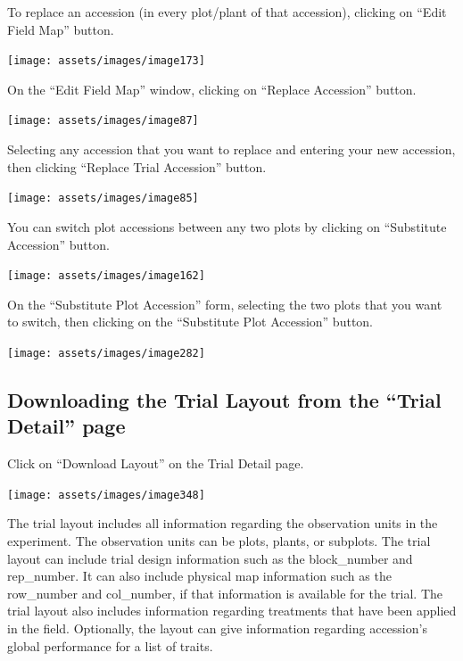 \documentclass[
  12pt,
]{book}
\begin{document}
To replace an accession (in every plot/plant of that accession), clicking on ``Edit Field Map'' button.

\begin{center}\texttt{[image: assets/images/image173]} \end{center}

On the ``Edit Field Map'' window, clicking on ``Replace Accession'' button.

\begin{center}\texttt{[image: assets/images/image87]} \end{center}

Selecting any accession that you want to replace and entering your new accession, then clicking ``Replace Trial Accession'' button.

\begin{center}\texttt{[image: assets/images/image85]} \end{center}

You can switch plot accessions between any two plots by clicking on ``Substitute Accession'' button.

\begin{center}\texttt{[image: assets/images/image162]} \end{center}

On the ``Substitute Plot Accession'' form, selecting the two plots that you want to switch, then clicking on the ``Substitute Plot Accession'' button.

\begin{center}\texttt{[image: assets/images/image282]} \end{center}

\hypertarget{downloading-the-trial-layout-from-the-trial-detail-page}{%
\subsection{Downloading the Trial Layout from the ``Trial Detail'' page}\label{downloading-the-trial-layout-from-the-trial-detail-page}}

Click on ``Download Layout'' on the Trial Detail page.

\begin{center}\texttt{[image: assets/images/image348]} \end{center}

The trial layout includes all information regarding the observation units in the experiment. The observation units can be plots, plants, or subplots. The trial layout can include trial design information such as the block\_number and rep\_number. It can also include physical map information such as the row\_number and col\_number, if that information is available for the trial. The trial layout also includes information regarding treatments that have been applied in the field. Optionally, the layout can give information regarding accession's global performance for a list of traits.
\end{document}
